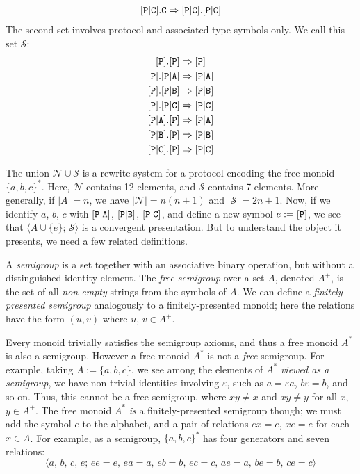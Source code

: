 \documentclass[../generics]{subfiles}
\begin{document}
\begin{example}
\begin{gather*}
[\texttt{P}|\texttt{C}].\texttt{C}\Rightarrow[\texttt{P}|\texttt{C}].[\texttt{P}|\texttt{C}]
\end{gather*}
The second set involves protocol and associated type symbols only. We call this set $\mathcal{S}$:
\begin{gather*}
\ProtoInherit{P}{P}\\
\protosym{P}.\assocsym{P}{A}\Rightarrow\assocsym{P}{A}\\
\protosym{P}.\assocsym{P}{B}\Rightarrow\assocsym{P}{B}\\
\protosym{P}.\assocsym{P}{C}\Rightarrow\assocsym{P}{C}\\
\ProtoConf{\assocsym{P}{A}}{P}\\
\ProtoConf{\assocsym{P}{B}}{P}\\
\ProtoConf{\assocsym{P}{C}}{P}
\end{gather*}

The union $\mathcal{N}\cup\mathcal{S}$ is a rewrite system for a protocol encoding the free monoid $\{a,b,c\}^*$. Here, $\mathcal{N}$ contains 12 elements, and $\mathcal{S}$ contains 7 elements. More generally, if $|A|=n$, we have $|\mathcal{N}|=n(n+1)$ and $|\mathcal{S}|=2n+1$. Now, if we identify $a$, $b$, $c$ with $[\texttt{P}|\texttt{A}]$, $[\texttt{P}|\texttt{B}]$, $[\texttt{P}|\texttt{C}]$, and define a new symbol $e:=[\texttt{P}]$, we see that $\langle A\cup\{e\};\,\mathcal{S}\rangle$ is a convergent presentation. But to understand the object it presents, we need a few related definitions.

A \emph{semigroup} is a set together with an associative binary operation, but without a distinguished identity element. The \emph{free semigroup} over a set $A$, denoted $A^+$, is the set of all \emph{non-empty} strings from the symbols of $A$. We can define a \emph{finitely-presented semigroup} analogously to a finitely-presented monoid; here the relations have the form $(u,v)$ where $u$, $v\in A^+$.

Every monoid trivially satisfies the semigroup axioms, and thus a free monoid $A^*$ is also a semigroup. However a free monoid $A^*$ is not a \emph{free} semigroup. For example, taking $A:=\{a,b,c\}$, we see among the elements of $A^*$ \emph{viewed as a semigroup}, we have non-trivial identities involving $\varepsilon$, such as $a=\varepsilon a$, $b\varepsilon=b$, and so on. Thus, this cannot be a free semigroup, where $xy\neq x$ and $xy\neq y$ for all $x$, $y\in A^+$. The free monoid $A^*$ \emph{is} a finitely-presented semigroup though; we must add the symbol $e$ to the alphabet, and a pair of relations $ex=e$, $xe=e$ for each $x\in A$. For example, as a semigroup, $\{a,b,c\}^*$ has four generators and seven relations:
\[\langle a,\,b,\,c,\,e;\,ee=e,\,ea=a,\,eb=b,\,ec=c,\,ae=a,\,be=b,\,ce=c\rangle\]


\end{example}
\end{document}
